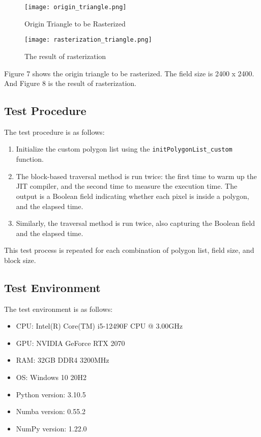 \documentclass[
	a4paper, %
	10pt, %
	unnumberedsections, %
	twoside, %
]{LTJournalArticle}
\begin{document}
\begin{figure}[H] %
	\texttt{[image: origin\_triangle.png]}
	\caption{Origin Triangle to be Rasterized}
\end{figure}

\begin{figure}[H] %
	\texttt{[image: rasterization\_triangle.png]}
	\caption{The result of rasterization}
\end{figure}

Figure 7 shows the origin triangle to be rasterized. The field size is 2400 x 2400. And Figure 8 is the result of rasterization.

\subsection{Test Procedure}

The test procedure is as follows:

\begin{enumerate}
    \item Initialize the custom polygon list using the \texttt{initPolygonList\_custom} function.
    
    \item The block-based traversal method is run twice: the first time to warm up the JIT compiler, and the second time to measure the execution time. The output is a Boolean field indicating whether each pixel is inside a polygon, and the elapsed time.
    
    \item Similarly, the traversal method is run twice, also capturing the Boolean field and the elapsed time.
\end{enumerate}

This test process is repeated for each combination of polygon list, field size, and block size.

\subsection{Test Environment}

The test environment is as follows:

\begin{itemize}
	\item CPU: Intel(R) Core(TM) i5-12490F CPU @ 3.00GHz
	\item GPU: NVIDIA GeForce RTX 2070
	\item RAM: 32GB DDR4 3200MHz
	\item OS: Windows 10 20H2
	\item Python version: 3.10.5
	\item Numba version: 0.55.2
	\item NumPy version: 1.22.0
\end{itemize}
\end{document}
